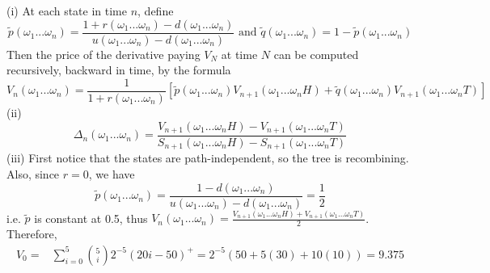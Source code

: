 \documentclass[12pt]{article}
\newenvironment{exercise}[2][Exercise]{\begin{trivlist}
		\item[\hskip \labelsep {\bfseries #1}\hskip \labelsep {\bfseries #2.}]}{\end{trivlist}}
\begin{document}
	\begin{exercise}{9}\end{exercise}
	(i) At each state in time $n$, define 
	$$\tilde{p}(\omega_1...\omega_n) = \frac{1+r(\omega_1...\omega_n)-d(\omega_1...\omega_n)}{u(\omega_1...\omega_n)-d(\omega_1...\omega_n)}\text{ and } \tilde{q}(\omega_1...\omega_n) = 1-\tilde{p}(\omega_1...\omega_n)$$
	Then the price of the derivative paying $V_N$ at time $N$ can be computed recursively, backward in time, by the formula
	$$V_n(\omega_1...\omega_n)=\frac{1}{1+r(\omega_1...\omega_n)}[\tilde{p}(\omega_1...\omega_n)V_{n+1}(\omega_1...\omega_nH)+\tilde{q}(\omega_1...\omega_n)V_{n+1}(\omega_1...\omega_nT)]$$
	(ii) $$\Delta_n(\omega_1...\omega_n)= \frac{V_{n+1}(\omega_1...\omega_nH)-V_{n+1}(\omega_1...\omega_nT)}{S_{n+1}(\omega_1...\omega_nH)-S_{n+1}(\omega_1...\omega_nT)}$$
	(iii) First notice that the states are path-independent, so the tree is recombining.
	Also, since $r=0$, we have $$\tilde{p}(\omega_1...\omega_n) = \frac{1-d(\omega_1...\omega_n)}{u(\omega_1...\omega_n)-d(\omega_1...\omega_n)} = \frac{1}{2}$$
	i.e. $\tilde{p}$ is constant at 0.5, thus $V_n(\omega_1...\omega_n) = \frac{V_{n+1}(\omega_1...\omega_nH)+V_{n+1}(\omega_1...\omega_nT)}{2}$. Therefore, 
	\begin{align*}V_0 =& \sum_{i=0}^5{5 \choose i}2^{-5}(20i - 50)^+ = 2^{-5}(50+5(30)+10(10))=9.375\end{align*}
	 
\end{document}
